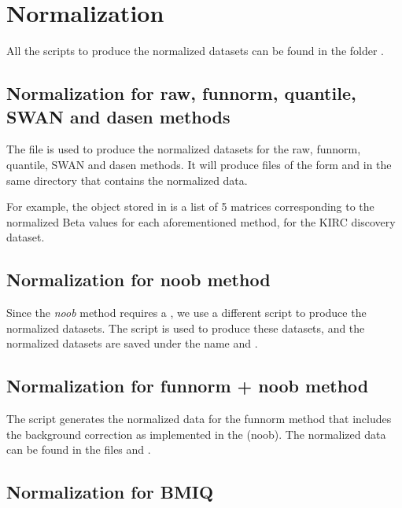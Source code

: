 \documentclass[12pt]{article}
\begin{document}
\section{Normalization}

All the scripts to produce the normalized datasets can be found in the folder . 

\subsection{Normalization for raw, funnorm, quantile, SWAN and dasen methods }
The file  is used to produce the normalized datasets for the raw, funnorm, quantile, SWAN and dasen methods. It will produce files of the form  and  in the same directory that contains the normalized data. 

For example, the object stored in  is a list of 5 matrices corresponding to the normalized Beta values for each aforementioned method, for the KIRC discovery dataset. 

\subsection{Normalization for noob method}

Since the \textit{noob} method requires a , we use a different script to produce the normalized datasets. The script  is used to produce these datasets, and the normalized datasets are saved under the name  and . 

\subsection{Normalization for funnorm + noob method}

The script  generates the normalized data for the funnorm method that includes the background correction as implemented in the  (noob). The normalized data can be found in the files  and .

\subsection{Normalization for BMIQ}
\end{document}
